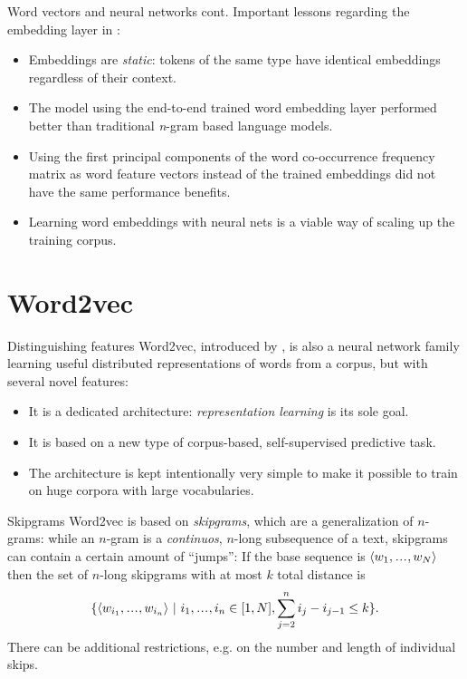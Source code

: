 \documentclass[style=upen, size=14pt]{powerdot}
\newcommand\varlist{,\makebox[1em][c]{.\hfil.\hfil.},}
\theoremstyle{definition}
\begin{document}
\begin{slide}[toc=]{Word vectors and neural networks cont.}
  Important lessons regarding the embedding layer in \cite{bengio2003neural}:
  \begin{itemize}
  \item Embeddings are \emph{static}: tokens of the same type have identical
    embeddings regardless of their context.
  \item The model using the end-to-end trained word embedding layer performed
    better than traditional \emph{n}-gram based language models.
  \item Using the first principal components of the word co-occurrence frequency
    matrix as word feature vectors instead of the trained embeddings did not
    have the same performance benefits.
  \item Learning word embeddings with neural nets is a viable way of scaling up
    the training corpus. 
  \end{itemize}
\end{slide}

\section{Word2vec}

\begin{slide}[toc=Novelties]{Distinguishing features}
  Word2vec, introduced by \cite{mikolov2013efficient}, is also a neural network
  family learning useful distributed representations of words from a corpus, but
  with several novel features:
  \begin{itemize}
  \item It is a dedicated architecture: \emph{representation learning} is its
    sole goal.
  \item It is based on a new type of corpus-based, self-supervised predictive
    task.
  \item The architecture is kept intentionally very simple to make it possible
    to train on huge corpora with large vocabularies.
  \end{itemize}
\end{slide}

\begin{slide}[toc=Skipgrams]{Skipgrams}
  Word2vec is based on \emph{skipgrams}, which are a generalization of
  $n$-grams: while an $n$-gram is a \emph{continuos}, $n$-long subsequence of a
  text, skipgrams can contain a certain amount of ``jumps'': If the base
  sequence is $\langle w_1\varlist w_N\rangle$ then the set of $n$-long
  skipgrams with at most $k$ total distance is
  $$
  \{\langle w_{i_1} \varlist w_{i_n}\rangle~|~ i_1\varlist i_n\in[1, N],
  \sum_{j=2}^n i_j-i_{j-1} \leq k \}.
  $$
  There can be additional restrictions, e.g. on the number and length of
  individual skips.
\end{slide}
\end{document}
